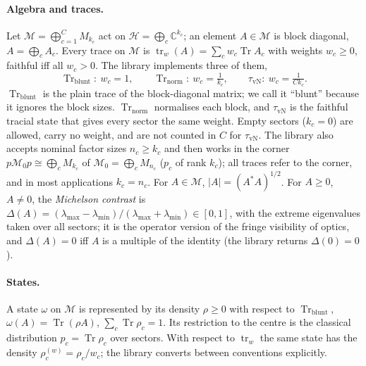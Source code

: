 \documentclass[11pt]{article}
\DeclareMathOperator{\Tr}{Tr}
\newcommand{\C}{\mathbb{C}}
\newcommand{\M}{\mathcal{M}}
\begin{document}
\paragraph{Algebra and traces.} Let $\M=\bigoplus_{c=1}^C M_{k_c}$ act on $\mathcal H=\bigoplus_c\C^{k_c}$; an element
$A\in\M$ is block diagonal, $A=\bigoplus_c A_c$. Every trace on $\M$ is $\operatorname{tr}_w(A)=\sum_c w_c\Tr A_c$
with weights $w_c\ge0$, faithful iff all $w_c>0$. The library implements three of them,
\[
  \Tr_{\mathrm{blunt}}:\ w_c=1,\qquad \Tr_{\mathrm{norm}}:\ w_c=\tfrac1{k_c},\qquad
  \tau_{\mathrm{vN}}:\ w_c=\tfrac1{Ck_c}.
\]
$\Tr_{\mathrm{blunt}}$ is the plain trace of the block-diagonal matrix; we call it ``blunt'' because it ignores the block
sizes. $\Tr_{\mathrm{norm}}$ normalises each block, and $\tau_{\mathrm{vN}}$ is the faithful tracial state that gives
every sector the same weight. Empty sectors ($k_c=0$) are allowed, carry no weight, and are not counted in $C$ for
$\tau_{\mathrm{vN}}$. The library also accepts nominal factor sizes $n_c\ge k_c$ and then works in the corner
$p\M_0p\cong\bigoplus_cM_{k_c}$ of $\M_0=\bigoplus_cM_{n_c}$ ($p_c$ of rank $k_c$); all traces refer to the corner, and
in most applications $k_c=n_c$. For $A\in\M$, $|A|=(A^*A)^{1/2}$. For $A\ge0$, $A\ne0$, the \emph{Michelson contrast}
is $\Delta(A)=(\lambda_{\max}-\lambda_{\min})/(\lambda_{\max}+\lambda_{\min})\in[0,1]$, with the extreme eigenvalues
taken over all sectors; it is the operator version of the fringe visibility of optics, and $\Delta(A)=0$ iff $A$ is a
multiple of the identity (the library returns $\Delta(0)=0$).

\paragraph{States.} A state $\omega$ on $\M$ is represented by its density $\rho\ge0$ with respect to
$\Tr_{\mathrm{blunt}}$, $\omega(A)=\Tr(\rho A)$, $\sum_c\Tr\rho_c=1$. Its restriction to the centre is the classical
distribution $p_c=\Tr\rho_c$ over sectors. With respect to $\operatorname{tr}_w$ the same state has the density
$\rho^{(w)}_c=\rho_c/w_c$; the library converts between conventions explicitly.
\end{document}
